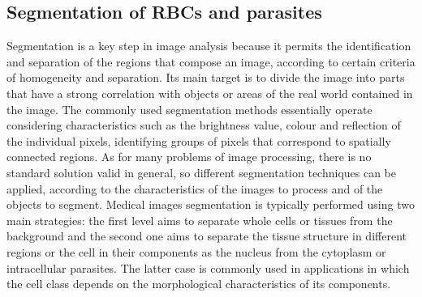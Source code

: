 \documentclass[sensors,review,submit,moreauthors,pdftex,10pt,a4paper]{mdpi}
\begin{document}
	
	\subsection{Segmentation of RBCs and parasites}
	Segmentation is a key step in image analysis because it permits the identification and separation of the regions that compose an image, according to certain criteria of homogeneity and separation. Its main target is to divide the image into parts that have a strong correlation with objects or areas of the real world contained in the image.
	The commonly used segmentation methods essentially operate considering characteristics such as the brightness value, colour and reflection of the individual pixels, identifying groups of pixels that correspond to spatially connected regions. As for many problems of image processing, there is no standard solution valid in general, so different segmentation techniques can be applied, according to the characteristics of the images to process and of the objects to segment.
	Medical images segmentation is typically performed using two main strategies: the first level aims to separate whole cells or tissues from the background and the second one aims to separate the tissue structure in different regions or the cell in their components as the nucleus from the cytoplasm or intracellular parasites. The latter case is commonly used in applications in which the cell class depends on the morphological characteristics of its components.
	
\end{document}
